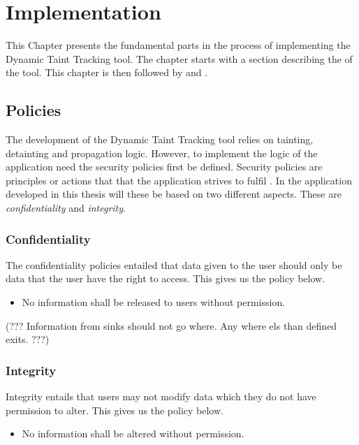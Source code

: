\chapter{Implementation}
This Chapter presents the fundamental parts in the process of implementing the Dynamic Taint Tracking tool. The chapter starts with a section describing the \textit{} of the tool. This chapter is then followed by \textit{} and \textit{}.


\section{Policies}
\label{Policies}
The development of the Dynamic Taint Tracking tool relies on tainting, detainting and propagation logic. However, to implement the logic of the application need the security policies first be defined. Security policies are principles or actions that that the application strives to fulfil \parencite{BayukJenniferL2012Cspg}. In the application developed in this thesis will these be based on two different aspects. These are \textit{confidentiality} and \textit{integrity}.


\subsection{Confidentiality}
The confidentiality policies entailed that data given to the user should only be data that the user have the right to access. This gives us the policy below.

\hfill
\begin{itemize}
	\item No information shall be released to users without permission.
\end{itemize}
\hfill

(??? Information from sinks should not go where. Any where els than defined exits. ???)


\subsection{Integrity}
Integrity entails that users may not modify data which they do not have permission to alter. This gives us the policy below.

\hfill
\begin{itemize}
	\item No information shall be altered without permission.
\end{itemize}
\hfill

